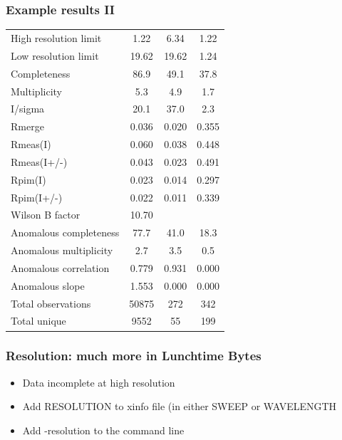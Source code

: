 \documentclass[slides,compress]{beamer}
\begin{document}
\begin{frame}
\frametitle{Example results II}
\begin{tabular}{lccc}
High resolution limit         &         1.22 &  6.34 &  1.22 \\
Low resolution limit          &        19.62 & 19.62 &  1.24 \\
Completeness                  &         86.9 &  49.1 &  37.8 \\
Multiplicity                  &        5.3  &  4.9   & 1.7 \\
I/sigma                       &        20.1 &  37.0  &  2.3 \\
Rmerge                        &       0.036 & 0.020  &0.355 \\
Rmeas(I)                      &       0.060 & 0.038  &0.448 \\
Rmeas(I+/-)                   &       0.043 & 0.023  &0.491 \\
Rpim(I)                       &       0.023 & 0.014  &0.297 \\
Rpim(I+/-)                    &       0.022 & 0.011  &0.339 \\
Wilson B factor               &       10.70& \\
Anomalous completeness        &        77.7  & 41.0  & 18.3 \\
Anomalous multiplicity        &         2.7  &  3.5  &  0.5 \\
Anomalous correlation         &        0.779 & 0.931 & 0.000 \\
Anomalous slope               &       1.553  &0.000 & 0.000 \\
Total observations            &       50875  &272   & 342 \\
Total unique                  &       9552   &55    & 199 \\
\end{tabular}
\end{frame}

\begin{frame}
\frametitle{Resolution: much more in Lunchtime Bytes}
\begin{itemize}
\item{Data incomplete at high resolution}
\item{Add RESOLUTION to xinfo file (in either SWEEP or WAVELENGTH}
\item{Add -resolution to the command line}
\end{itemize}
\end{frame}
\end{document}
